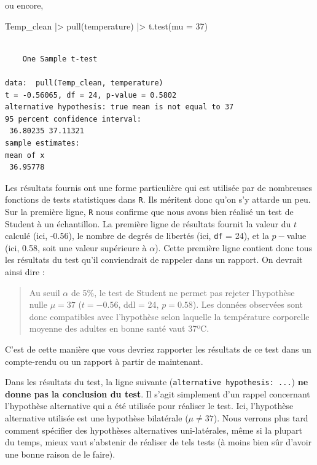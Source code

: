 \documentclass[
  french,
  a4paper,
  DIV=11,
  numbers=noendperiod,
  oneside]{scrreprt}
\newenvironment{Shaded}{}{}
\newcommand{\AttributeTok}[1]{\textcolor[rgb]{0.84,0.23,0.29}{#1}}
\newcommand{\DecValTok}[1]{\textcolor[rgb]{0.00,0.36,0.77}{#1}}
\newcommand{\FunctionTok}[1]{\textcolor[rgb]{0.44,0.26,0.76}{#1}}
\newcommand{\NormalTok}[1]{\textcolor[rgb]{0.14,0.16,0.18}{#1}}
\newcommand{\SpecialCharTok}[1]{\textcolor[rgb]{0.00,0.36,0.77}{#1}}
\begin{document}
ou encore,

\begin{Shaded}
\begin{Highlighting}[]
\NormalTok{Temp\_clean }\SpecialCharTok{|\textgreater{}}
  \FunctionTok{pull}\NormalTok{(temperature) }\SpecialCharTok{|\textgreater{}}
  \FunctionTok{t.test}\NormalTok{(}\AttributeTok{mu =} \DecValTok{37}\NormalTok{)}
\end{Highlighting}
\end{Shaded}

\begin{verbatim}

    One Sample t-test

data:  pull(Temp_clean, temperature)
t = -0.56065, df = 24, p-value = 0.5802
alternative hypothesis: true mean is not equal to 37
95 percent confidence interval:
 36.80235 37.11321
sample estimates:
mean of x 
 36.95778 
\end{verbatim}

Les résultats fournis ont une forme particulière qui est utilisée par de
nombreuses fonctions de tests statistiques dans \texttt{R}. Ils méritent
donc qu'on s'y attarde un peu.\\
Sur la première ligne, \texttt{R} nous confirme que nous avons bien
réalisé un test de Student à un échantillon. La première ligne de
résultats fournit la valeur du \(t\) calculé (ici, -0.56), le nombre de
degrés de libertés (ici, \texttt{df} = 24), et la \(p-\)value (ici,
0.58, soit une valeur supérieure à \(\alpha\)). Cette première ligne
contient donc tous les résultats du test qu'il conviendrait de rappeler
dans un rapport. On devrait ainsi dire :

\begin{quote}
Au seuil \(\alpha\) de 5\%, le test de Student ne permet pas rejeter
l'hypothèse nulle \(\mu = 37\) (\(t = -0.56\), ddl = 24, \(p = 0.58\)).
Les données observées sont donc compatibles avec l'hypothèse selon
laquelle la température corporelle moyenne des adultes en bonne santé
vaut 37ºC.
\end{quote}

C'est de cette manière que vous devriez rapporter les résultats de ce
test dans un compte-rendu ou un rapport à partir de maintenant.

Dans les résultats du test, la ligne suivante
(\texttt{alternative\ hypothesis:\ ...}) \textbf{ne donne pas la
conclusion du test}. Il s'agit simplement d'un rappel concernant
l'hypothèse alternative qui a été utilisée pour réaliser le test. Ici,
l'hypothèse alternative utilisée est une hypothèse bilatérale
(\(\mu \neq 37\)). Nous verrons plus tard comment spécifier des
hypothèses alternatives uni-latérales, même si la plupart du temps,
mieux vaut s'abstenir de réaliser de tels tests (à moins bien sûr
d'avoir une bonne raison de le faire).
\end{document}
